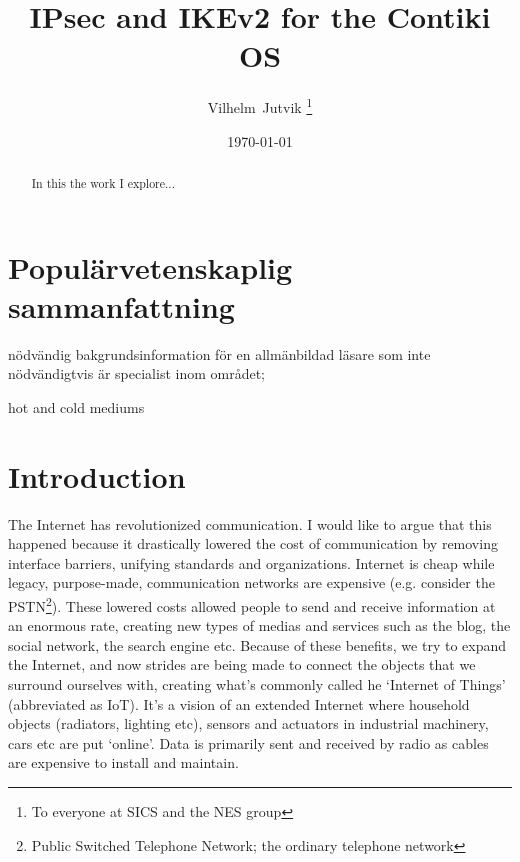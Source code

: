 \documentclass[final,a4paper,twoside,11pt,onecolumn]{report}
\begin{document}
\author{Vilhelm~Jutvik \thanks{To everyone at SICS and the NES group}}
\date{\today}
\title{IPsec and IKEv2 for the Contiki OS}

\maketitle

% 
% 

\begin{abstract}
In this the work I explore...
\end{abstract}

\setcounter{tocdepth}{4}
\tableofcontents

\chapter{Populärvetenskaplig sammanfattning}
nödvändig bakgrundsinformation för en allmänbildad läsare som inte nödvändigtvis är specialist inom området;

hot and cold mediums

\chapter{Introduction}
\label{cha:intro}
The Internet has revolutionized communication. I would like to argue that this happened because it drastically lowered the cost of communication by removing interface barriers, unifying standards and organizations. Internet is cheap while legacy, purpose-made, communication networks are expensive (e.g. consider the PSTN\footnote{Public Switched Telephone Network; the ordinary telephone network}). These lowered costs allowed people to send and receive information at an enormous rate, creating new types of medias and services such as the blog, the social network, the search engine etc. Because of these benefits, we try to expand the Internet, and now strides are being made to connect the objects that we surround ourselves with, creating what's commonly called he `Internet of Things' (abbreviated as IoT). It's a vision of an extended Internet where household objects (radiators, lighting etc), sensors and actuators in industrial machinery, cars etc are put `online'. Data is primarily sent and received by radio as cables are expensive to install and maintain.
\end{document}
